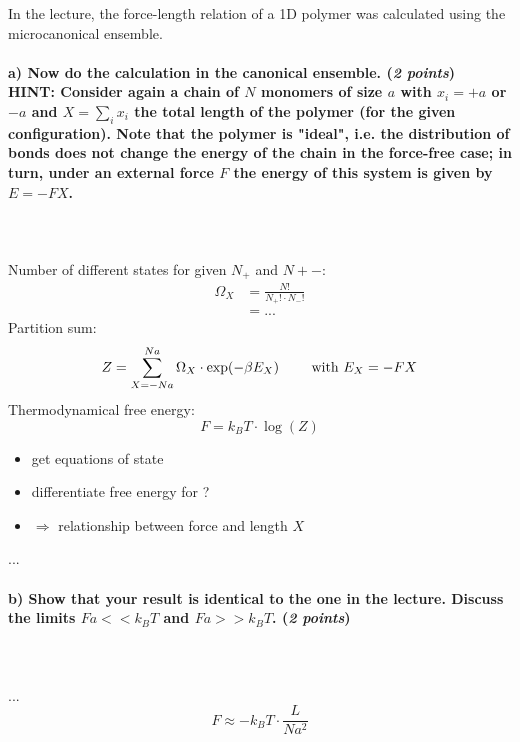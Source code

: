 In the lecture, the force-length relation of a 1D polymer was calculated
using the microcanonical ensemble.

\paragraph{a) Now do the calculation in the canonical ensemble.
    (\textit{2 points}) \\
    HINT: Consider again a chain of $N$ monomers of size $a$ with $x_i=+a$ or 
    $-a$ and $X=\sum_ix_i$ the total length of the polymer (for the given 
    configuration). Note that the polymer is "ideal", i.e. the distribution of 
    bonds does not change the energy of the chain in the force-free case;
    in turn, under an external force $F$ the energy of this system is given by 
    $E=-FX$.
} \ \\
    \\
    Number of different states for given $N_+$ and $N+-$:
    \begin{align}
        \Omega_X
        &=\frac{N!}{N_+!\cdot N_-!} \\
        &=...
    \end{align}
    Partition sum:
    \begin{equation}
        Z=\sum_{X=-Na}^{Na}\Omega_X\cdot\exp(-\beta E_X)
        \ \ \ \ \ \ \ \textnormal{with }
        E_X=-FX
    \end{equation}
    Thermodynamical free energy:
    \begin{equation}
        F=k_BT\cdot\log(Z)
    \end{equation}
    \begin{itemize}
        \item get equations of state
        \item differentiate free energy for ?
        \item $\Rightarrow$ relationship between force and length $X$
    \end{itemize}
    ...

\paragraph{b) Show that your result is identical to the one in the lecture.
    Discuss the limits $Fa<<k_BT$ and $Fa>>k_BT$. (\textit{2 points})
} \ \\
    \\
    ...
    \begin{equation}
        F\approx-k_BT\cdot\frac{L}{Na^2}
    \end{equation}

